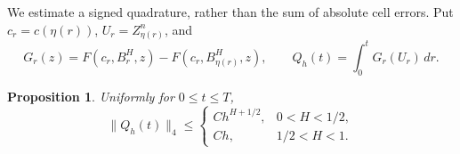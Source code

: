 \documentclass[11pt]{article}
\newtheorem{proposition}[theorem]{Proposition}
\theoremstyle{remark}
\newcommand{\norm}[1]{\lVert#1\rVert}
\begin{document}
We estimate a signed quadrature, rather than the sum of absolute cell
errors. Put \(c_r=c(\eta(r))\), \(U_r=Z^n_{\eta(r)}\), and
\begin{equation}\label{eq:GQ}
 G_r(z)=F(c_r,B^H_r,z)-F(c_r,B^H_{\eta(r)},z),\qquad
 Q_h(t)=\int_0^tG_r(U_r)\,dr.
\end{equation}

\begin{proposition}\label{prop:fractional-Q}
Uniformly for \(0\le t\le T\),
\begin{equation}\label{eq:fractional-Q}
 \norm{Q_h(t)}_4\le
 \begin{cases}
 C h^{H+1/2},&0<H<1/2,\\
 C h,&1/2<H<1 .
 \end{cases}
\end{equation}
\end{proposition}
\end{document}
